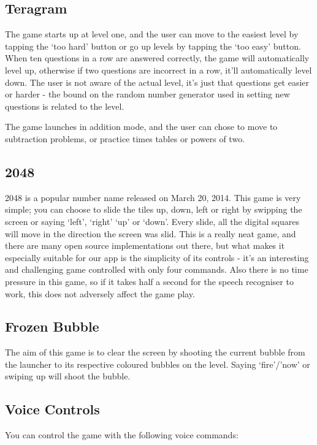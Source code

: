 \documentclass[11pt, oneside]{article}
\begin{document}
\subsection{Teragram}

The game starts up at level one, and the user can move to the easiest
level by tapping the `too hard' button or go up levels by tapping the
`too easy' button. When ten questions in a row are answered correctly,
the game will automatically level up, otherwise if two questions are incorrect in a 
row, it'll automatically level down.  The user is not aware of the actual level, it's just that
questions get easier or harder - the bound on the random number
generator used in setting new questions is related to the level.

The game launches in addition mode, and the user can chose to move to
subtraction problems, or practice times tables or powers of two.

\subsection{2048}

2048 is a popular number name released on March 20, 2014. This game is
very simple; you can choose to slide the tiles up, down, left or right
by swipping the screen or saying `left', `right' `up' or `down'. Every
slide, all the digital squares will move in the direction the screen was slid. 
This is a really neat game, and there are many open source
implementations out there, but what makes it especially suitable for
our app is the simplicity of its controls - it's an interesting and
challenging game controlled with only four commands. Also there is no
time pressure in this game, so if it takes half a second for the
speech recogniser to work, this does not adversely affect the game
play.

\subsection{Frozen Bubble}
The aim of this game is to clear the screen by shooting the current
bubble from the launcher to its respective coloured bubbles on the
level. Saying `fire'/'now' or swiping up will shoot the bubble.

\subsection{Voice Controls}

You can control the game with the following voice commands:
\end{document}
